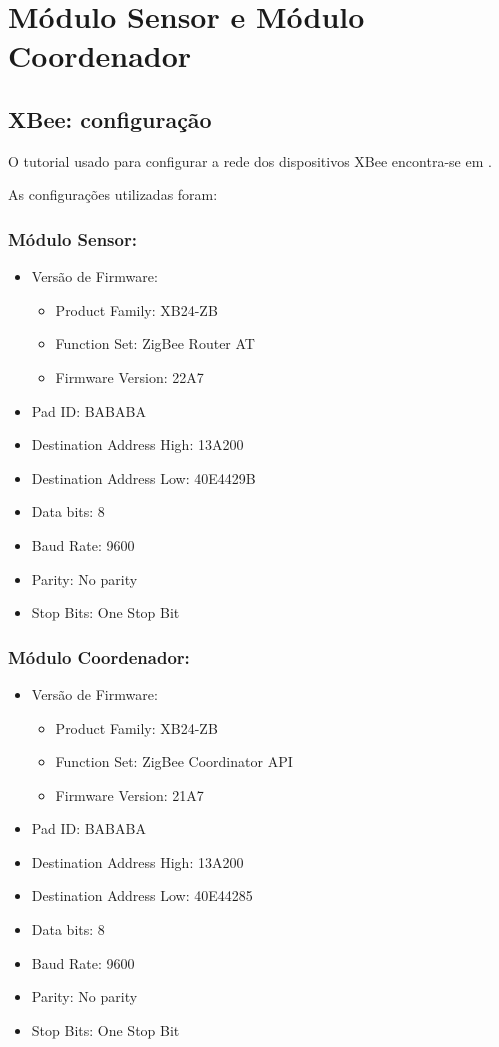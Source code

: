 \section{Módulo Sensor e Módulo Coordenador}
\label{Sec:5-hardware}

\subsection{XBee: configuração}
O tutorial usado para configurar a rede dos dispositivos XBee encontra-se em \cite{xbee_setup}.

As configurações utilizadas foram: 

\subsubsection{Módulo Sensor:}
\begin{itemize}
	\item Versão de Firmware:
    \begin{itemize}
    	\item Product Family: XB24-ZB
        \item Function Set: ZigBee Router AT
        \item Firmware Version: 22A7
    \end{itemize}
    \item Pad ID: BABABA
        \item Destination Address High: 13A200
        \item Destination Address Low: 40E4429B
        \item Data bits: 8
        \item Baud Rate: 9600
        \item Parity: No parity
        \item Stop Bits: One Stop Bit
\end{itemize}

\subsubsection{Módulo Coordenador:}
\begin{itemize}
	\item Versão de Firmware:
    \begin{itemize}
    	\item Product Family: XB24-ZB
        \item Function Set: ZigBee Coordinator API
        \item Firmware Version: 21A7
    \end{itemize}
    \item Pad ID: BABABA
        \item Destination Address High: 13A200
        \item Destination Address Low: 40E44285
        \item Data bits: 8
        \item Baud Rate: 9600
        \item Parity: No parity
        \item Stop Bits: One Stop Bit
\end{itemize}

